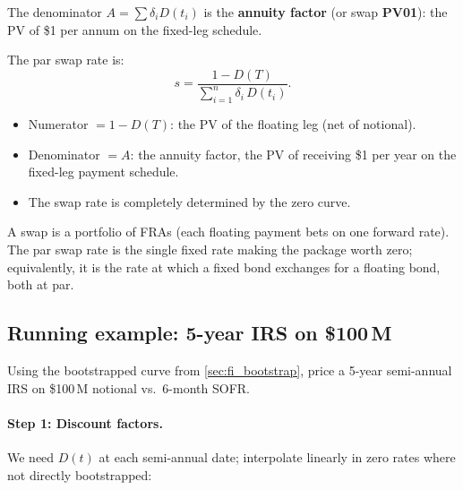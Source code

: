 The denominator $A = \sum \delta_i D(t_i)$ is the \textbf{annuity
factor} (or swap \textbf{PV01}): the PV of \$1 per annum on the
fixed-leg schedule.

\begin{keyfactbox}
The par swap rate is:
\[
  s = \frac{1 - D(T)}{\displaystyle\sum_{i=1}^{n} \delta_i\,D(t_i)}.
\]
\begin{itemize}
  \item Numerator $= 1 - D(T)$: the PV of the floating leg
    (net of notional).
  \item Denominator $= A$: the annuity factor, the PV of receiving
    \$1 per year on the fixed-leg payment schedule.
  \item The swap rate is completely determined by the zero curve.
\end{itemize}
\end{keyfactbox}

\begin{intuitionbox}
A swap is a portfolio of FRAs (each floating payment bets on one
forward rate).  The par swap rate is the single fixed rate making
the package worth zero; equivalently, it is the rate at which a
fixed bond exchanges for a floating bond, both at par.
\end{intuitionbox}

\subsection{Running example: 5-year IRS on \$100\,M}
\label{sec:fi_irs_example}

Using the bootstrapped curve from \cref{sec:fi_bootstrap}, price a
5-year semi-annual IRS on \$100\,M notional vs.\ 6-month SOFR.

\paragraph{Step 1: Discount factors.}
We need $D(t)$ at each semi-annual date; interpolate linearly in
zero rates where not directly bootstrapped:


